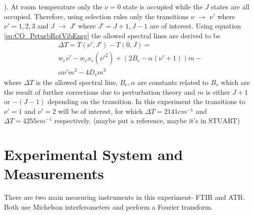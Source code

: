 \documentclass[reprint,amsmath,amssymb,aps, prl]{revtex4-2}
\begin{document}
). At room temperature only the $\nu=0$ state is occupied while the $J$ states are all occupied. Therefore, using selection rules \cite{griffithsQM} only the transitions $\nu$ $\rightarrow $ $\nu'$  where $\nu ' =1,2,3$  and $J$ $\rightarrow $ $J'$ where $J'=J+1,J-1$   are of interest. Using equation \ref{eq:CO_PeturbRotVibEnrg}
the allowed spectral lines are derived to be
\begin{equation} \label{eq:CO_DiffPeturbEnrg}
\begin{split}
& \Delta T =T(\nu ',J')-T(0,J)=\\
& w_{e}\nu' -w_{e}x_{e}(\nu'^{2})+(2B_{e}-\alpha(\nu'+1))m-\\
& \alpha\nu'm^2-4D_{v}m^{3}
\end{split}
\end{equation}
where $\Delta T$ is the allowed spectral line, $B_{e},\alpha $ are constants related to $B_{v}$  which are the result of further corrections due to perturbation theory and $m$ is either $J+1$ or $-(J-1)$  depending on the transition. In this experiment the transitions to $\nu'=1$ and $\nu' =2$ will be of interest, for which $\Delta T=2141cm^{-1}$ and $\Delta T = 4255 cm^{-1}$ respectively. (maybe put a reference, maybe it's in STUART)


\section{Experimental System and Measurements}
There are two main measuring instruments in this experiment- FTIR and ATR. Both use Michelson interferometers and perform a Fourier transform.
\end{document}
